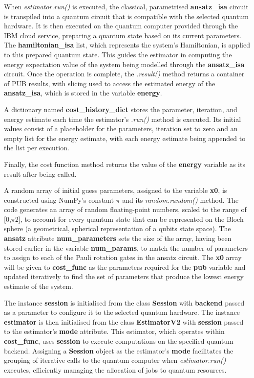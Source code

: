 \documentclass{article}
\begin{document}
{When \textit{estimator.run()} is executed, the classical, parametrised \textbf{ansatz\_isa} circuit is transpiled into a quantum circuit that is compatible with the selected quantum hardware. It is then executed on the quantum computer provided through the IBM cloud service, preparing a quantum state based on its current parameters\cite{EstimatorV2}\cite{Tutorial}. The \textbf{hamiltonian\_isa} list, which represents the system's Hamiltonian, is applied to this prepared quantum state. This guides the estimator in computing the energy expectation value of the system being modelled through the \textbf{ansatz\_isa} circuit. Once the operation is complete, the \textit{.result()} method returns a container of PUB results\cite{PrimitiveResult}, with slicing used to access the estimated energy of the \textbf{ansatz\_isa}, which is stored in the variable \textbf{energy}.

A dictionary named \textbf{cost\_history\_dict} stores the parameter, iteration, and energy estimate each time the estimator's \textit{.run()} method is executed. Its initial values consist of a placeholder for the parameters, iteration set to zero and an empty list for the energy estimate, with each energy estimate being appended to the list per execution. 

Finally, the cost function method returns the value of the \textbf{energy} variable as its result after being called.

A random array of initial guess parameters, assigned to the variable \textbf{x0}, is constructed using NumPy’s constant $\pi$ and its \textit{random.random()} method. The code generates an array of random floating-point numbers, scaled to the range of [0,$\pi$2], to account for every quantum state that can be represented on the Bloch sphere (a geometrical, spherical representation of a qubits state space\cite{blocsphere}). The \textbf{ansatz} attribute \textbf{num\_parameters} sets the size of the array, having been stored earlier in the variable \textbf{num\_params}, to match the number of parameters to assign to each of the Pauli rotation gates in the ansatz circuit. The \textbf{x0} array will be given to \textbf{cost\_func} as the parameters required for the \textbf{pub} variable and updated iteratively to find the set of parameters that produce the lowest energy estimate of the system.

The instance \textbf{session} is initialised from the class \textbf{Session} with \textbf{backend} passed as a parameter to configure it to the selected quantum hardware. The instance \textbf{estimator} is then initialised from the class \textbf{EstimatorV2} with \textbf{session} passed to the estimator's \textbf{mode} attribute. This estimator, which operates within \textbf{cost\_func}, uses \textbf{session} to execute computations on the specified quantum backend. Assigning a  \textbf{Session} object as the estimator's \textbf{mode} facilitates the grouping of iterative calls to the quantum computer when \textit{estimator.run()} executes, efficiently managing the allocation of jobs to quantum resources\cite{Session}.

}
\end{document}
